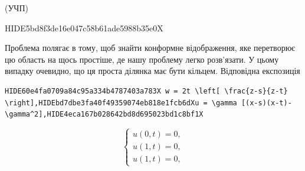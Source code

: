 \documentclass[
  ukrainian,
]{article}
\begin{document}
(УЧП)

HIDE5bd8f3de16e047c58b61ade5988b35e0X

Проблема полягає в тому, щоб знайти конформне відображення, яке
перетворює цю область на щось простіше, де нашу проблему легко
розв'язати. У цьому випадку очевидно, що ця проста ділянка має бути
кільцем. Відповідна експозиція

\begin{verbatim}
HIDE60e4fa0709a84c95a334b4787403a783X w = 2t \left[ \frac{z-s}{z-t} \right],HIDEbd7dbe3fa40f49359074eb818e1fcb6dXu = \gamma [(x-s)(x-t)-\gamma^2],HIDE4eca167b028642bd8d695023bd1c8bf1X
\end{verbatim}

\[
\begin{cases} u(0, t) = 0, \\ u(1, t) = 0, \\ u(1, t) = 0, \end{cases}
\]
\end{document}
